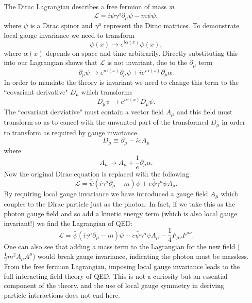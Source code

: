 The Dirac Lagrangian describes a free fermion of mass \textit{m}
\begin{equation}
\mathcal{L} = i \psi \gamma^\mu \partial_ \mu \psi - m\bar{\psi}\psi,
\end{equation}
where $\psi$ is a Dirac spinor and $\gamma^\mu$ represent the Dirac matrices. To demonstrate local gauge invariance we need to transform
\begin{equation}
\psi(x) \rightarrow e^{i\alpha(x)}\psi(x), 
\end{equation}
where $\alpha(x)$ depends on space and time arbitrarily. Directly substituting this into our Lagrangian shows that $\mathcal{L}$ is not invariant, due to the $\partial_\mu$ term 
\begin{equation}
\partial_\mu \psi \rightarrow e^{i\alpha(x)}\partial_\mu\psi + ie^{i\alpha(x)}\partial_\mu \alpha.
\end{equation}
In order to mandate the theory is invariant we need to change this term to the ``covariant derivative" $D_\mu$ which transforms 
\begin{equation}
D_\mu\psi \rightarrow e^{i\alpha(x)}D_\mu\psi. 
\end{equation}	 
The ``covariant derviative" must contain a vector field $A_\mu$ and this field must transform so as to cancel with the unwanted part of the transformed $D_\mu$ in order to transform as required by gauge invariance. 
\begin{equation}
D_\mu \equiv \partial_\mu - ieA_\mu
\end{equation}
where 
\begin{equation}
A_\mu \rightarrow A_\mu + \frac{1}{e}\partial_\mu \alpha.
\end{equation}
Now the original Dirac equation is replaced with the following:
\begin{equation}
\mathcal{L} = \bar{\psi}(i\gamma^\mu\partial_\mu-m)\psi + e\bar{\psi}\gamma^\mu\psi A_\mu.
\end{equation}
By requiring local gauge invariance we have introduced a gauge field $A_\mu$ which couples to the Dirac particle just as the photon. In fact, if we take this as the photon gauge field and so add a kinetic energy term (which is also local gauge invariant!) we find the Lagrangian of QED: 
\begin{equation}
\mathcal{L} = \bar{\psi}(i\gamma^\mu\partial_\mu-m)\psi + e\bar{\psi}\gamma^\mu\psi A_\mu -\frac{1}{4} F_{\mu\nu}F^{\mu\nu}.
\end{equation}
One can also see that adding a mass term to the Lagrangian for the new field ($\frac{1}{2}m^2A_\mu A^\mu$) would break gauge invariance, indicating the photon must be massless. From the free fermion Lagrangian, imposing local gauge invariance leads to the full interacting field theory of QED. This is not a curiosity but an essential component of the theory, and the use of local gauge symmetry in deriving particle interactions does not end here.


